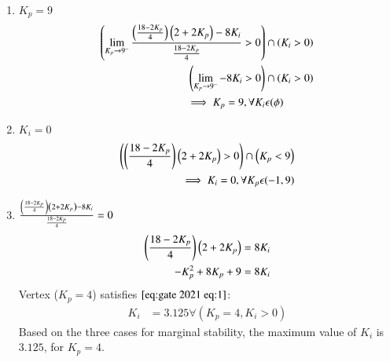 \documentclass[journal,12pt,onecolumn]{IEEEtran}
\theoremstyle{remark}
\begin{document}
    \begin{enumerate}
        \item $K_p=9$\\
         \begin{align}
       \left(\lim_{K_p\to9^-} \frac{\left(\frac{18-2K_p}{4}\right)\left(2 + 2K_p\right)-8K_i}{\frac{18-2K_p}{4}} > 0\right) &\cap \left(K_i > 0\right)\\
       \left(\lim_{K_p\to9^-} -8K_i > 0\right) &\cap \left({K_i > 0}\right)\\
  \implies K_p=9 , \forall K_i &\epsilon (\phi)
    \end{align}
    \item  $K_i=0$\\
    \begin{align}
        \left(\left(\frac{18-2K_p}{4}\right)\left(2 + 2K_p\right) > 0\right)  \cap \left(K_p < 9\right)\\
        \implies K_i=0 , \forall K_p \epsilon (-1 , 9)
    \end{align}
    \item $\frac{\left(\frac{18-2K_p}{4}\right)\left(2 + 2K_p\right)-8K_i}{\frac{18-2K_p}{4}} = 0$\\
        \begin{align}
            \left(\frac{18-2K_p}{4}\right)\left(2 + 2K_p\right) = 8K_i\\
             -K_p^2 +8K_p + 9 = 8K_i
        \end{align}
        Vertex ($K_p=4$) satisfies $\eqref{eq:gate 2021 eq:1}$:
        \begin{align}
            K_i &= 3.125 \forall (K_p = 4 ,K_i>0)
        \end{align}
          Based on the three cases for marginal stability, the maximum value of $K_i$ is $3.125$, for $K_p = 4$.\\
          \end{enumerate}
\end{document}
